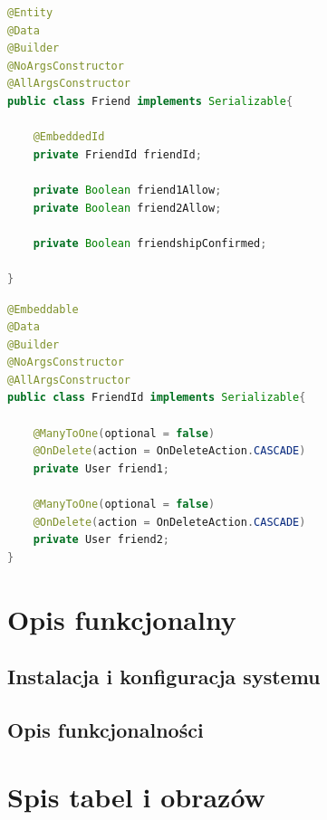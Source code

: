 \documentclass{report}
\begin{document}
		\begin{lstlisting}[language=Java, breaklines]
@Entity
@Data
@Builder
@NoArgsConstructor
@AllArgsConstructor
public class Friend implements Serializable{

    @EmbeddedId
    private FriendId friendId;

    private Boolean friend1Allow;
    private Boolean friend2Allow;

    private Boolean friendshipConfirmed;

}
		\end{lstlisting}

		\begin{lstlisting}[language=Java, breaklines]
@Embeddable
@Data
@Builder
@NoArgsConstructor
@AllArgsConstructor
public class FriendId implements Serializable{

    @ManyToOne(optional = false)
    @OnDelete(action = OnDeleteAction.CASCADE)
    private User friend1;

    @ManyToOne(optional = false)
    @OnDelete(action = OnDeleteAction.CASCADE)
    private User friend2;
}
		\end{lstlisting}


\chapter{Opis funkcjonalny}

	\section{Instalacja i konfiguracja systemu}
	
	\section{Opis funkcjonalności}


\chapter{Spis tabel i obrazów}


\begingroup
\let\clearpage\relax
\listoffigures
\listoftables
\endgroup
\end{document}
